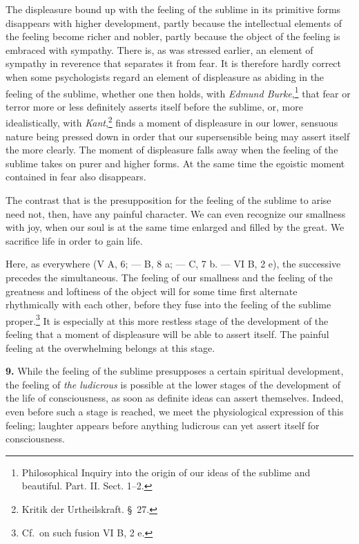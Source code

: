 \documentclass[12pt,a4paper]{book}
\newcommand{\opage}[1]{\marginnote{\footnotesize\textit{[#1]}}}
\begin{document}
The displeasure bound up with the feeling of the sublime in its
primitive forms disappears with higher development, partly because the
intellectual elements of the feeling become richer and nobler, partly
because the object of the feeling is embraced with sympathy. There is,
as was stressed earlier, an element of sympathy in reverence that
separates it from fear. It is therefore hardly correct when some
psychologists regard an element of displeasure as abiding in the feeling
of the sublime, whether one then holds,
with \emph{Edmund Burke},\footnote{Philosophical Inquiry into the
origin of our ideas of the sublime and beautiful. Part. II. Sect. 1--2.}
that fear or
\opage{343}terror more or less definitely asserts itself before the
sublime, or, more idealistically, with
\emph{Kant},\footnote{Kritik der Urtheilskraft. \S~27.} finds a moment
of displeasure in our lower, sensuous nature being pressed down in order
that our supersensible being may assert itself the more clearly. The
moment of displeasure falls away when the feeling of the sublime takes
on purer and higher forms. At the same time the egoistic moment
contained in fear also disappears.

The contrast that is the presupposition for the feeling of the sublime
to arise need not, then, have any painful character. We can even
recognize our smallness with joy, when our soul is at the same time
enlarged and filled by the great. We sacrifice life in order to gain
life.

Here, as everywhere (V A, 6; --- B, 8 a; --- C, 7 b. --- VI B, 2 e), the
successive precedes the simultaneous. The feeling of our smallness and
the feeling of the greatness and loftiness of the object will for some
time first alternate rhythmically with each other, before they fuse
into the feeling of the sublime
proper.\footnote{Cf.\ on such fusion VI B, 2 e.} It is especially at
this more restless stage of the development of the feeling that a
moment of displeasure will be able to assert itself. The painful feeling
at the overwhelming belongs at this stage.

\textbf{9.} While the feeling of the sublime presupposes a certain
spiritual development, the feeling of \emph{the ludicrous} is possible
at the lower stages of the development of the life of consciousness, as
soon as definite ideas can assert themselves. Indeed, even before such a
stage is reached, we meet the physiological expression of this feeling;
laughter appears before anything ludicrous can yet assert itself for
consciousness.
\end{document}
